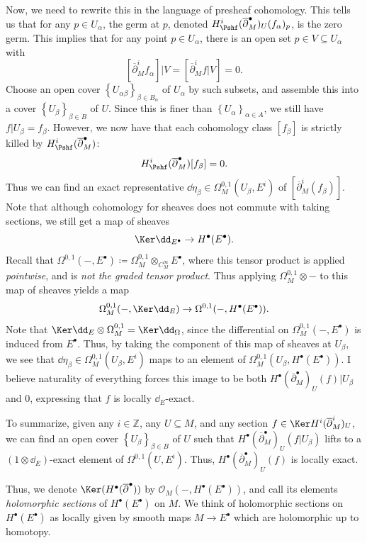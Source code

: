 \begin{discussion}
	Now, we need to rewrite this in the language of presheaf cohomology. This tells us that for any $p\in U_\alpha $, the germ at $p$, denoted $H^i_{\Pshf } (\overline{\partial } ^{\bullet} _M)_U(f_\alpha )_p$, is the zero germ. This implies that for any point $p\in U_\alpha $, there is an open set $p\in V \subseteq U_\alpha $ with
	\[
		\left[ \overline{\partial } ^i_M f_\alpha  \right] |V = \left[ \overline{\partial } ^i_Mf|V \right] =0
	.\]
	Choose an open cover $\left\{ U_{\alpha \beta }  \right\} _{\beta \in B_\alpha } $ of $U_\alpha $ by such subsets, and assemble this into a cover $\left\{ U_{\beta }  \right\}_{\beta \in B} $ of $U$. Since this is finer than $\left\{ U_{\alpha }  \right\}_{\alpha \in A} $, we still have $f|U_\beta =f_\beta $. However, we now have that each cohomology class $[f_\beta ]$ is strictly killed by $H^i_{\Pshf }(\overline{\partial } ^{\bullet} _M)$:
	\[
		H^i_{\Pshf }(\overline{\partial } ^{\bullet} _M)[f_\beta ]=0
	.\]
	Thus we can find an exact representative $\dd \eta_\beta \in \Omega ^{0,1} _M(U_\beta ,E^i)$ of $[\overline{\partial }^i_M(f_\beta)]$. Note that although cohomology for sheaves does not commute with taking sections, we still get a map of sheaves
	\[
		\Ker \dd _{E^{\bullet} } \to H^{\bullet} (E^{\bullet} )
	.\]
	Recall that $\Omega ^{0,1}(-,E^{\bullet} )\coloneqq \Omega ^{0,1} _M \otimes_{C^\infty_M}  E^{\bullet} $, where this tensor product is applied \emph{pointwise}, and is \emph{not the graded tensor product}. Thus applying $\Omega ^{0,1} _M \otimes -$ to this map of sheaves yields a map
	\[
		\Omega ^{0,1}_M(-, \Ker \dd _{E}) \to \Omega^{0,1} (-,H^{\bullet} (E^{\bullet} ))
	.\]
	Note that $\Ker \dd _{E} \otimes \Omega ^{0,1} _M = \Ker \dd _{\Omega } $, since the differential on $\Omega ^{0,1} _M(-,E^{\bullet} )$ is induced from $E^{\bullet} $. Thus, by taking the component of this map of sheaves at $U_\beta $, we see that $\dd \eta_\beta  \in \Omega ^{0,1} _M(U_\beta ,E^i)$ maps to an element of $\Omega ^{0,1} _M(U_\beta ,H^{\bullet} (E^{\bullet} ))$. I believe naturality of everything forces this image to be both $H^{\bullet} (\overline{\partial }^{\bullet} _M)_U(f)|U_\beta $ and $0$, expressing that $f$ is locally $\dd _{E} $-exact.

	To summarize, given any $i\in\mathbb{Z} $, any $U\subseteq M$, and any section $f\in \Ker H^i( \overline{\partial } ^i_M)_U$, we can find an open cover $\left\{ U_\beta  \right\}_{\beta \in B} $ of $U$ such that $H^{\bullet} (\overline{\partial } ^{\bullet} _M)_U(f|U_\beta)$ lifts to a $(1\otimes \dd _E)$-exact element of $\Omega ^{0,1} (U,E^i)$. Thus, $H^{\bullet} (\overline{\partial } ^{\bullet}_M)_U(f)$ is locally exact.

	Thus, we denote $\Ker (H^{\bullet} (\overline{\partial } ^{\bullet} ))$ by $\mathcal{O} _M(-,H^{\bullet} (E^{\bullet} ))$, and call its elements \emph{holomorphic sections} of $H^{\bullet} (E^{\bullet} )$ on $M$. We think of holomorphic sections on $H^{\bullet} (E^{\bullet} )$ as locally given by smooth maps $M\to E^{\bullet} $ which are holomorphic up to homotopy.
\end{discussion}

